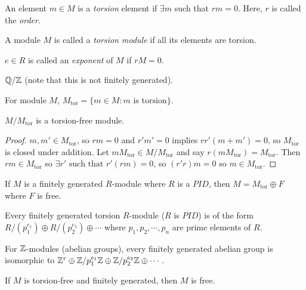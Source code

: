 \documentclass[a4paper,twoside,master.tex]{subfiles}
\begin{document}
\begin{definition}
    An element $ m \in M $ is a \textit{torsion} element if $ \exists m $ such that $ rm = 0 $. Here, $ r $ is called the \textit{order}.
\end{definition}
\begin{definition}
    A module $ M $ is called a \textit{torsion module} if all its elements are torsion.
\end{definition}
\begin{definition}
    $ e \in R $ is called an \textit{exponent} of $ M $ if $ rM = 0 $. 
\end{definition}
\begin{ex}
    $ \mathbb{Q} / \mathbb{Z} $ (note that this is not finitely generated).
\end{ex}
\begin{definition}
    For module $ M $, $ M_{\text{tor}} = \{m \in M \colon m \text{ is torsion}\} $. 
\end{definition}
\begin{claim}
    $ M/M_{\text{tor}} $ is a torsion-free module.
\end{claim}
\begin{proof}
    $ m,m' \in M_{\text{tor}} $, so $ rm = 0 $ and $ r'm' = 0 $ implies $ rr'(m + m') = 0 $, so $ M_{\text{tor}} $ is closed under addition. Let $ mM_{\text{tor}} \in M/M_{\text{tor}} $ and say $ r(m M_{\text{tor}}) = M_{\text{tor}} $. Then $ rm \in M_{\text{tor}} $ so $ \exists r' \text{ such that } r'(rm)= 0 $, so $ (r'r)m = 0 $ so $ m \in M_{\text{tor}} $.
\end{proof}
\begin{claim}
    If $ M $ is a finitely generated $ R $-module where $ R $ is a $ PID $, then $ M = M_{\text{tor}} \oplus F $ where $ F $ is free.
\end{claim}
\begin{claim}
    Every finitely generated torsion $ R $-module ($ R $ is $ PID $) is of the form $ R/(p_1^{e_1}) \oplus R/(p_2^{e_2}) \oplus \cdots $ where $ p_1, p_2, \cdots, p_n $ are prime elements of $ R $. 
\end{claim}
\begin{ex}
    For $ \mathbb{Z} $-modules (abelian groups), every finitely generated abelian group is isomorphic to $ \mathbb{Z}^r \oplus \mathbb{Z}/p_1^{e_1}\mathbb{Z} \oplus \mathbb{Z}/p_2^{e_2}\mathbb{Z} \oplus \cdots $.
\end{ex}
\begin{lemma}
    If $ M $ is torsion-free and finitely generated, then $ M $ is free.
\end{lemma}
\end{document}
